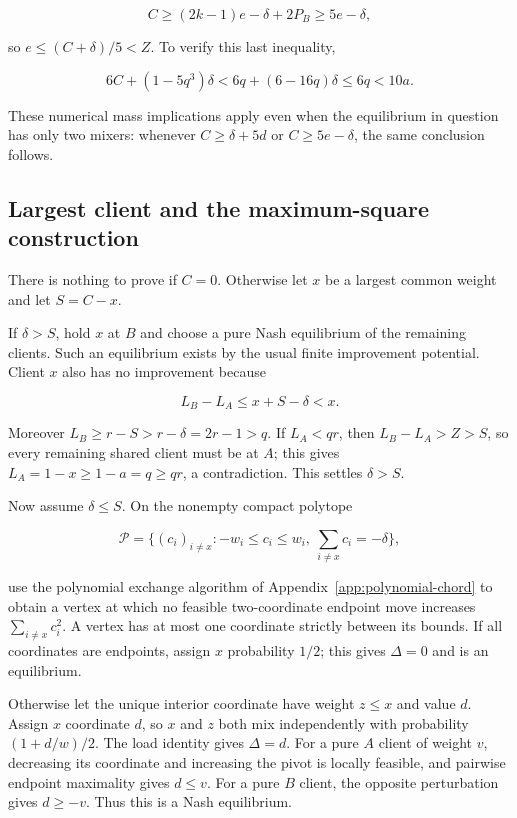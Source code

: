 \documentclass[11pt,a4paper]{article}
\begin{document}
\[
C\ge(2k-1)e-\delta+2P_B\ge5e-\delta,
\]

so \(e\le(C+\delta)/5<Z\). To verify this last inequality,

\[
6C+(1-5q^3)\delta<6q+(6-16q)\delta\le6q<10a.
\]

These numerical mass implications apply even when the equilibrium in question has only two mixers: whenever \(C\ge\delta+5d\) or \(C\ge5e-\delta\), the same conclusion follows.

\hypertarget{largest-client-and-the-maximum-square-construction}{%
\subsection{Largest client and the maximum-square construction}\label{largest-client-and-the-maximum-square-construction}}

There is nothing to prove if \(C=0\). Otherwise let \(x\) be a largest common weight and let \(S=C-x\).

If \(\delta>S\), hold \(x\) at \(B\) and choose a pure Nash equilibrium of the remaining clients. Such an equilibrium exists by the usual finite improvement potential. Client \(x\) also has no improvement because

\[
L_B-L_A\le x+S-\delta<x.
\]

Moreover \(L_B\ge r-S>r-\delta=2r-1>q\). If \(L_A<qr\), then \(L_B-L_A>Z>S\), so every remaining shared client must be at \(A\); this gives \(L_A=1-x\ge1-a=q\ge qr\), a contradiction. This settles \(\delta>S\).

Now assume \(\delta\le S\). On the nonempty compact polytope

\[
\mathcal P=\{(c_i)_{i\ne x}: -w_i\le c_i\le w_i,\ \sum_{i\ne x}c_i=-\delta\},
\]

use the polynomial exchange algorithm of Appendix~\ref{app:polynomial-chord} to obtain a vertex at which no feasible two-coordinate endpoint move increases \(\sum_{i\ne x}c_i^2\). A vertex has at most one coordinate strictly between its bounds. If all coordinates are endpoints, assign \(x\) probability \(1/2\); this gives \(\Delta=0\) and is an equilibrium.

Otherwise let the unique interior coordinate have weight \(z\le x\) and value \(d\). Assign \(x\) coordinate \(d\), so \(x\) and \(z\) both mix independently with probability \((1+d/w)/2\). The load identity gives \(\Delta=d\). For a pure \(A\) client of weight \(v\), decreasing its coordinate and increasing the pivot is locally feasible, and pairwise endpoint maximality gives \(d\le v\). For a pure \(B\) client, the opposite perturbation gives \(d\ge-v\). Thus this is a Nash equilibrium.
\end{document}
